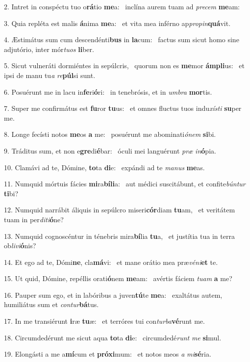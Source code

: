 2. Intret in conspéctu tuo o\textbf{rá}tio \textbf{me}a: \ast\  inclína aurem tuam ad \textit{pre}\textit{cem} \textbf{me}am:\

3. Quia repléta est malis \textbf{á}nima \textbf{me}a: \ast\  et vita mea inférno ap\textit{pro}\textit{pin}\textbf{quá}vit.\

4. Æstimátus sum cum descendénti\textbf{bus} in \textbf{la}cum: \ast\  factus sum sicut homo sine adjutório, inter mór\textit{tu}\textit{os} \textbf{li}ber.\

5. Sicut vulneráti dormiéntes in sepúlcris, \dag\  quorum non es \textbf{me}mor \textbf{ám}\textbf{pli}us: \ast\  et ipsi de manu tu\textit{a} \textit{re}\textbf{púl}si sunt.\

6. Posuérunt me in lacu in\textbf{fe}ri\textbf{ó}ri: \ast\  in tenebrósis, et in \textit{um}\textit{bra} \textbf{mor}tis.\

7. Super me confirmátus est \textbf{fu}ror \textbf{tu}us: \ast\  et omnes fluctus tuos indu\textit{xís}\textit{ti} \textbf{su}per me.\

8. Longe fecísti notos \textbf{me}os \textbf{a} me: \ast\  posuérunt me abominati\textit{ó}\textit{nem} \textbf{si}bi.\

9. Tráditus sum, et non e\textbf{gre}di\textbf{é}bar: \ast\  óculi mei languérunt \textit{præ} \textit{in}\textbf{ó}pia.\

10. Clamávi ad te, Dómine, \textbf{to}ta \textbf{di}e: \ast\  expándi ad te \textit{ma}\textit{nus} \textbf{me}as.\

11. Numquid mórtuis fácies \textbf{mi}ra\textbf{bí}\textbf{li}a: \ast\  aut médici suscitábunt, et confite\textit{bún}\textit{tur} \textbf{ti}bi?\

12. Numquid narrábit áliquis in sepúlcro miseri\textbf{cór}diam \textbf{tu}am, \ast\  et veritátem tuam in per\textit{di}\textit{ti}\textbf{ó}ne?\

13. Numquid cognoscéntur in ténebris mira\textbf{bí}lia \textbf{tu}a, \ast\  et justítia tua in terra ob\textit{li}\textit{vi}\textbf{ó}nis?\

14. Et ego ad te, Dómi\textbf{ne}, cla\textbf{má}vi: \ast\  et mane orátio mea præ\textit{vé}\textit{ni}\textbf{et} te.\

15. Ut quid, Dómine, repéllis orati\textbf{ó}nem \textbf{me}am: \ast\  avértis fáciem \textit{tu}\textit{am} \textbf{a} me?\

16. Pauper sum ego, et in labóribus a juven\textbf{tú}te \textbf{me}a: \ast\  exaltátus autem, humiliátus sum et \textit{con}\textit{tur}\textbf{bá}tus.\

17. In me transiérunt \textbf{i}ræ \textbf{tu}æ: \ast\  et terróres tui con\textit{tur}\textit{ba}\textbf{vé}runt me.\

18. Circumdedérunt me sicut aqua \textbf{to}ta \textbf{di}e: \ast\  circumdedé\textit{runt} \textit{me} \textbf{si}mul.\

19. Elongásti a me a\textbf{mí}cum et \textbf{pró}\textbf{xi}mum: \ast\  et notos meos \textit{a} \textit{mi}\textbf{sé}ria.\

